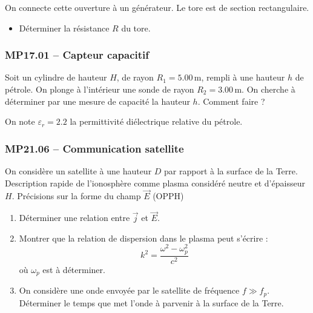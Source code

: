  On connecte cette ouverture à un générateur. Le tore est de section rectangulaire.

\begin{itemize}[label=\textbullet]
    \item Déterminer la résistance $R$ du tore.
\end{itemize}


\subsubsection*{MP17.01 -- Capteur capacitif }

Soit un cylindre de hauteur $H$, de rayon $R_1 = 5.00\, \text{m}$, rempli à une hauteur $h$ de pétrole. On plonge à l'intérieur une sonde de rayon $R_2 = 3.00\, \text{m}$. On cherche à déterminer par une mesure de capacité la hauteur $h$. Comment faire ?

On note $\varepsilon_r = 2.2$ la permittivité diélectrique relative du pétrole.

\newpage
\subsubsection*{MP21.06 -- Communication satellite  \lesdeux}

On considère un satellite à une hauteur $D$ par rapport à la surface de la Terre. Description rapide de l'ionosphère comme plasma considéré neutre et d'épaisseur $H$. Précisions sur la forme du champ $\vec{E}$ (OPPH)

\begin{enumerate}
    \item Déterminer une relation entre $\vec{j}$ et $\vec{E}$.
    \item Montrer que la relation de dispersion dans le plasma peut s'écrire :
    \[
    k^2 = \frac{\omega^2 - \omega_p^2}{c^2}
    \]
    où $\omega_p$ est à déterminer.
    \item On considère une onde envoyée par le satellite de fréquence $f \gg f_p$. Déterminer le temps que met l'onde à parvenir à la surface de la Terre.
\end{enumerate}

